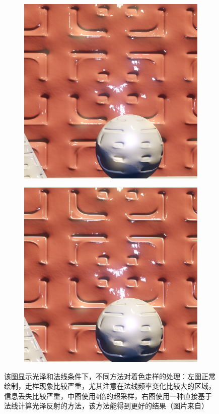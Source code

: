 \begin{figure}
\begin{fullwidth}
\begin{subfigure}[b]{0.33\thewidth}
		\includegraphics[width=1.\textwidth]{figures/intro/specaliasing_4xss}
	\end{subfigure}
	\begin{subfigure}[b]{0.33\thewidth}
		\includegraphics[width=1.\textwidth]{figures/intro/specaliasing_clean}
	\end{subfigure}
\caption{该图显示光泽和法线条件下，不同方法对着色走样的处理：左图正常绘制，走样现象比较严重，尤其注意在法线频率变化比较大的区域，信息丢失比较严重，中图使用4倍的超采样，右图使用一种直接基于法线计算光泽反射的方法，该方法能得到更好的结果（图片来自\cite{m:ApplyingSamplingTheorytoReal-TimeGraphics}）}
\label{f:intro-shader-aliasing}
\end{fullwidth}
\end{figure}

